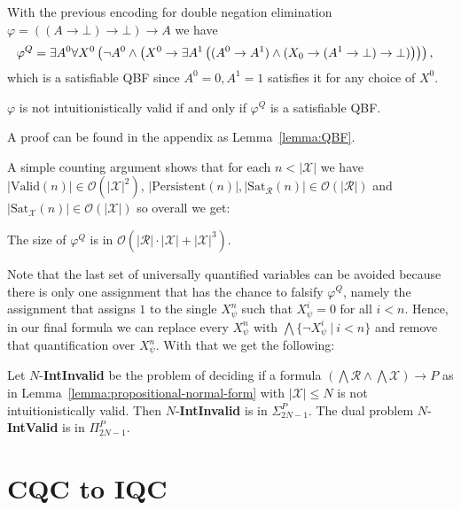 \documentclass[runningheads]{llncs}
\begin{document}
\begin{example}
	With the previous encoding for double negation elimination $\varphi = ((A\to \bot)\to \bot)\to A$ we have
	$$\hspace*{-.3cm}
	\varphi^Q = \exists A^0\forall X^0\left(\neg A^0\wedge\left(X^0\to \exists A^1\left((A^0\to A^1)\wedge(X_0\to (A^1\to \bot)\to \bot)\right)\right)\right),
	$$
	which is a satisfiable QBF since $A^0 = 0, A^1 = 1$ satisfies it for any choice of $X^0$.
\end{example}


\begin{lemma}
	$\varphi$ is not intuitionistically valid if and only if $\varphi^Q$ is a satisfiable QBF.
\end{lemma}
A proof can be found in the appendix as Lemma~\ref{lemma:QBF}.

A simple counting argument shows that for each $n < |\mathcal X|$ we have $|\text{Valid}(n)|\in \mathcal O(|\mathcal X|^2)$, $|\text{Persistent}(n)|, |\text{Sat}_{\mathcal R}(n)|\in \mathcal O(|\mathcal R|)$ and $|\text{Sat}_{\mathcal X}(n)|\in \mathcal O(|\mathcal X|)$ so overall we get:
\begin{lemma}
	The size of $\varphi^Q$ is in $\mathcal O(|\mathcal R|\cdot|\mathcal X| + |\mathcal X|^3)$.
\end{lemma}

Note that the last set of universally quantified variables can be avoided because there is only one assignment that has the chance to falsify $\varphi^Q$, namely the assignment that assigns $1$ to the single $X_\psi^n$ such that $X_\psi^i = 0$ for all $i < n$. Hence, in our final formula we can replace every $X_\psi^n$ with $\bigwedge\{\neg X_\psi^i\:|\:i < n\}$ and remove that quantification over $X_\psi^n$. With that we get the following:

\begin{corollary}
	Let $N$-\textbf{IntInvalid} be the problem of deciding if a formula $(\bigwedge \mathcal R\wedge\bigwedge\mathcal X)\to P$ as in Lemma~\ref{lemma:propositional-normal-form} with $|\mathcal X|\leq N$ is not intuitionistically valid. Then $N$-\textbf{IntInvalid} is in $\Sigma_{2N-1}^P$. The dual problem $N$-\textbf{IntValid} is in $\Pi_{2N-1}^P$.
\end{corollary}


\section{CQC to IQC}
\end{document}
